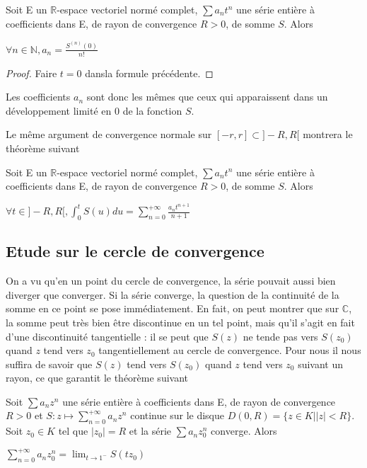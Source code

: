 \begin{thm}
Soit E un $\mathbb{R}$-espace vectoriel normé complet, $\sum a_n t^n$ une série entière à coefficients dans E, de rayon de convergence $R > 0$, de somme $S$. Alors

$\forall n \in \mathbb{N}, a_n = \frac{S^{(n)}(0)}{n!}$
\end{thm}

\begin{proof}
Faire $t = 0$ dansla formule précédente.
\end{proof}

\begin{rem}
Les coefficients $a_n$ sont donc les mêmes que ceux qui apparaissent dans un développement limité en 0 de la fonction $S$.
\end{rem}

Le même argument de convergence normale sur $[-r,r] \subset ]-R,R[$ montrera le théorème suivant

\begin{thm}
Soit E un $\mathbb{R}$-espace vectoriel normé complet, $\sum a_n t^n$ une série entière à coefficients dans E, de rayon de convergence $R > 0$, de somme $S$. Alors

$\forall t \in ]-R,R[, \int_0^t S(u) du = \sum_{n=0}^{+\infty} \frac{a_n t^{n+1}}{n+1}$
\end{thm}

\subsection{Etude sur le cercle de convergence}

On a vu qu'en un point du cercle de convergence, la série pouvait aussi bien diverger que converger. Si la série converge, la question de la continuité de la somme en ce point se pose immédiatement. En fait, on peut montrer que sur $\mathbb{C}$, la somme peut très bien être discontinue en un tel point, mais qu'il s'agit en fait d'une discontinuité tangentielle : il se peut que $S(z)$ ne tende pas vers $S(z_0)$ quand $z$ tend vers $z_0$ tangentiellement au cercle de convergence. Pour nous il nous suffira de savoir que $S(z)$ tend vers $S(z_0)$ quand $z$ tend vers $z_0$ suivant un rayon, ce que garantit le théorème suivant

\begin{thm}[Abel]
Soit $\sum a_n z^n$ une série entière à coefficients dans E, de rayon de convergence $R > 0$ et $S : z \mapsto \sum_{n=0}^{+\infty} a_n z^n$ continue sur le disque $D(0,R) = \{z \in K | |z| < R\}$. Soit $z_0 \in K$ tel que $|z_0| = R$ et la série $\sum a_n z_0^n$ converge. Alors

$\sum_{n=0}^{+\infty} a_n z_0^n = \lim_{t \rightarrow 1^-} S(t z_0)$
\end{thm}


